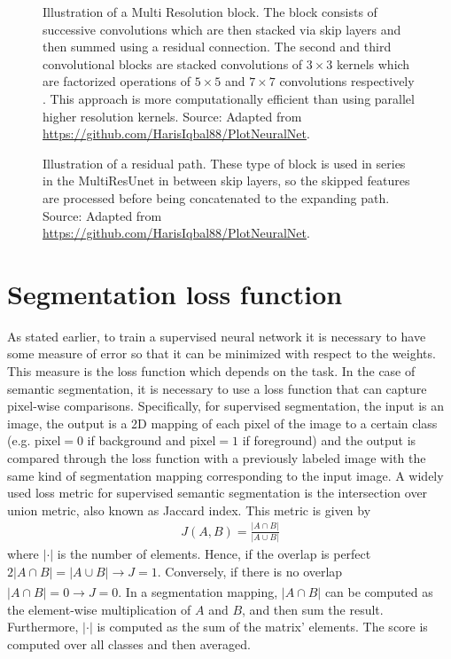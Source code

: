\begin{figure}
    \centering
    \resizebox{\linewidth}{!}{
    
    }
    \caption[Illustration of a Multi Resolution block]{Illustration of a Multi Resolution block. The block consists of successive convolutions which are then stacked via skip layers and then summed using a residual connection. The second and third convolutional blocks are stacked convolutions of $3\times3$ kernels which are factorized operations of $5\times 5$ and $7 \times7$ convolutions respectively \cite{conv-factor}. This approach is more computationally efficient than using parallel higher resolution kernels. Source: Adapted from \url{https://github.com/HarisIqbal88/PlotNeuralNet}.}
    \label{fig:multires}
\end{figure}

\begin{figure}
    \centering
    \resizebox{0.5\linewidth}{!}{
    
    }
    \caption[Illustration of a residual path]{Illustration of a residual path. These type of block is used in series in the MultiResUnet in between skip layers, so the skipped features are processed before being concatenated to the expanding path. Source: Adapted from \url{https://github.com/HarisIqbal88/PlotNeuralNet}.}
    \label{fig:respath}
\end{figure}

\clearpage
\section{Segmentation loss function}

As stated earlier, to train a supervised neural network it is necessary to have some measure of error so that it can be minimized with respect to the weights. This measure is the loss function which depends on the task. In the case of semantic segmentation, it is necessary to use a loss function that can capture pixel-wise comparisons. Specifically, for supervised segmentation, the input is an image, the output is a 2D mapping of each pixel of the image to a certain class (e.g. pixel$ = 0$ if background and pixel$ = 1$ if foreground) and the output is compared through the loss function with a previously labeled image with the same kind of segmentation mapping corresponding to the input image. A widely used loss metric for supervised semantic segmentation is the intersection over union metric, also known as Jaccard index. This metric is given by
\begin{align*}
    J(A, B) = \frac{|A\cap B|}{|A\cup B|}
\end{align*}
where $|\cdot|$ is the number of elements. Hence, if the overlap is perfect $2|A\cap B|=|A\cup B|\xrightarrow[]{} J=1$. Conversely, if there is no overlap $|A\cap B|=0\xrightarrow{} J=0$. In a segmentation mapping, $|A\cap B|$ can be computed as the element-wise multiplication of $A$ and $B$, and then sum the result. Furthermore, $|\cdot|$ is computed as the sum of the matrix' elements. The score is computed over all classes and then averaged.
    
